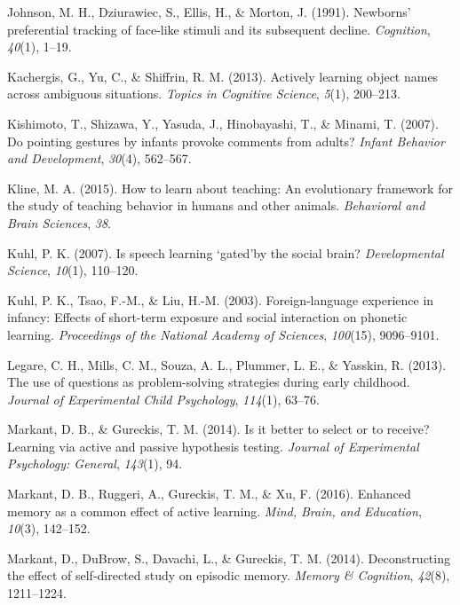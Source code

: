 \documentclass[a4paper,man,apacite,floatsintext]{apa6}
\begin{document}
\hypertarget{ref-johnson1991newborns}{}
Johnson, M. H., Dziurawiec, S., Ellis, H., \& Morton, J. (1991).
Newborns' preferential tracking of face-like stimuli and its subsequent
decline. \emph{Cognition}, \emph{40}(1), 1--19.

\hypertarget{ref-kachergis2013actively}{}
Kachergis, G., Yu, C., \& Shiffrin, R. M. (2013). Actively learning
object names across ambiguous situations. \emph{Topics in Cognitive
Science}, \emph{5}(1), 200--213.

\hypertarget{ref-kishimoto2007pointing}{}
Kishimoto, T., Shizawa, Y., Yasuda, J., Hinobayashi, T., \& Minami, T.
(2007). Do pointing gestures by infants provoke comments from adults?
\emph{Infant Behavior and Development}, \emph{30}(4), 562--567.

\hypertarget{ref-kline2015learn}{}
Kline, M. A. (2015). How to learn about teaching: An evolutionary
framework for the study of teaching behavior in humans and other
animals. \emph{Behavioral and Brain Sciences}, \emph{38}.

\hypertarget{ref-kuhl2007speech}{}
Kuhl, P. K. (2007). Is speech learning `gated'by the social brain?
\emph{Developmental Science}, \emph{10}(1), 110--120.

\hypertarget{ref-kuhl2003foreign}{}
Kuhl, P. K., Tsao, F.-M., \& Liu, H.-M. (2003). Foreign-language
experience in infancy: Effects of short-term exposure and social
interaction on phonetic learning. \emph{Proceedings of the National
Academy of Sciences}, \emph{100}(15), 9096--9101.

\hypertarget{ref-legare2013use}{}
Legare, C. H., Mills, C. M., Souza, A. L., Plummer, L. E., \& Yasskin,
R. (2013). The use of questions as problem-solving strategies during
early childhood. \emph{Journal of Experimental Child Psychology},
\emph{114}(1), 63--76.

\hypertarget{ref-markant2014better}{}
Markant, D. B., \& Gureckis, T. M. (2014). Is it better to select or to
receive? Learning via active and passive hypothesis testing.
\emph{Journal of Experimental Psychology: General}, \emph{143}(1), 94.

\hypertarget{ref-markant2016enhanced}{}
Markant, D. B., Ruggeri, A., Gureckis, T. M., \& Xu, F. (2016). Enhanced
memory as a common effect of active learning. \emph{Mind, Brain, and
Education}, \emph{10}(3), 142--152.

\hypertarget{ref-markant2014deconstructing}{}
Markant, D., DuBrow, S., Davachi, L., \& Gureckis, T. M. (2014).
Deconstructing the effect of self-directed study on episodic memory.
\emph{Memory \& Cognition}, \emph{42}(8), 1211--1224.
\end{document}

